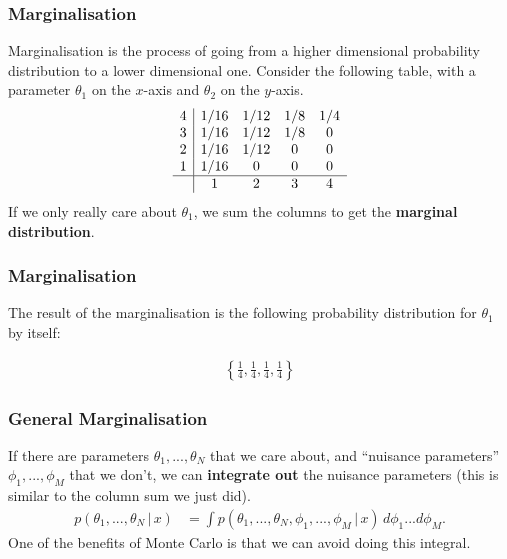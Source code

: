 \documentclass{beamer}
\newcommand{\given}{\,|\,}
\begin{document}
\begin{frame}
\frametitle{Marginalisation}
Marginalisation is the process of going from a higher dimensional probability
distribution to a lower dimensional one. Consider the following table,
with a parameter $\theta_1$ on the $x$-axis and $\theta_2$ on the $y$-axis.
\begin{align}
\begin{array}{c|cccc}
4 & 1/16 & 1/12 & 1/8 & 1/4 \\
3 & 1/16 & 1/12 & 1/8 & 0 \\
2 & 1/16 & 1/12 & 0   & 0 \\
1 & 1/16 & 0    & 0   & 0 \\
\hline
  & 1    & 2    & 3   & 4
\end{array}
\end{align}
\pause
If we only really care about $\theta_1$, we sum the columns
to get the {\bf marginal distribution}.


\end{frame}


\begin{frame}
\frametitle{Marginalisation}
The result of the marginalisation is the following probability distribution
for $\theta_1$ by itself:

\begin{center}
\begin{align}
\left\{\frac{1}{4}, \frac{1}{4}, \frac{1}{4}, \frac{1}{4}\right\}
\end{align}
\end{center}

\end{frame}


\begin{frame}
\frametitle{General Marginalisation}
If there are parameters $\theta_1, ..., \theta_N$ that we care about,
and ``nuisance parameters'' $\phi_1, ..., \phi_M$ that we don't, we can
{\bf integrate out} the nuisance parameters (this is similar to the column
sum we just did).
\pause
\begin{align}
p(\theta_1, ..., \theta_N \given x)
    &= \int p(\theta_1, ..., \theta_N, \phi_1, ..., \phi_M \given x)
            \, d\phi_1 ... d\phi_M.
\end{align}
\pause
One of the benefits of Monte Carlo is that we can avoid doing this integral.
\end{frame}
\end{document}
